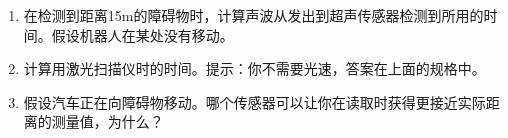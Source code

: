 \begin{enumerate}
\begin{enumerate}
\item 在检测到距离15m的障碍物时，计算声波从发出到超声传感器检测到所用的时间。假设机器人在某处没有移动。
\item 计算用激光扫描仪时的时间。提示：你不需要光速，答案在上面的规格中。
\item 假设汽车正在向障碍物移动。哪个传感器可以让你在读取时获得更接近实际距离的测量值，为什么？

\end{enumerate}
\end{enumerate}\normalsize
